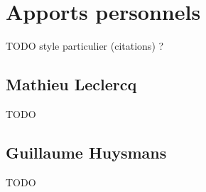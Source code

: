\section{Apports personnels}

TODO style particulier (citations) ?

\subsection{Mathieu Leclercq}
TODO

\subsection{Guillaume Huysmans}
TODO
